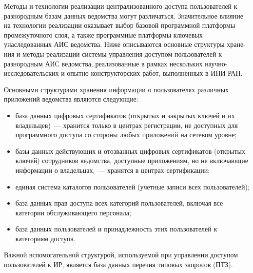 \begin{multicols}{2}
      Методы и технологии реализации цент\-ра\-ли\-зованного доступа пользователей к 
разнородным базам данных ведомства могут различаться. Значительное влияние на 
технологии реализации оказывает выбор базовой программной платформы промежуточного 
слоя, а также программные платформы ключевых унаследованных АИС ведомства. Ниже 
описываются основные структуры хране-\linebreak ния
и методы реализации системы управления\linebreak 
доступом пользователей к разнородным АИС ведомства, реализованные в рамках нескольких 
на\-уч\-но-исследовательских и опытно-кон\-струк\-тор\-ских 
работ, выполненных в ИПИ РАН.

      
      Основными структурами хранения информации о пользователях различных 
приложений ведомства являются следующие:
      \begin{itemize}
\item база данных цифровых сертификатов (открытых и закрытых ключей и их 
владельцев)~--- хранится только в центрах регистрации, не доступных для программного 
доступа со стороны любых приложений на сетевом уровне;
\item базы данных действующих и отозванных циф\-ро\-вых сертификатов (открытых 
ключей) сотрудников ведомства, доступные приложениям, но не включающие 
информации о\linebreak
 владельцах,~--- хранятся в центрах сертификации;
\item единая система каталогов пользователей (учетные записи всех пользователей);
\item база данных прав доступа всех категорий пользователей, включая все категории 
об\-слу\-жи\-ва\-юще\-го персонала;
\item база данных пользователей и принадлежность этих пользователей к категориям 
доступа.
\end{itemize}
      
      Важной вспомогательной структурой, используемой при управлении доступом 
пользователей к ИР, является база данных перечня типовых запросов 
(ПТЗ).
      

\end{multicols}
